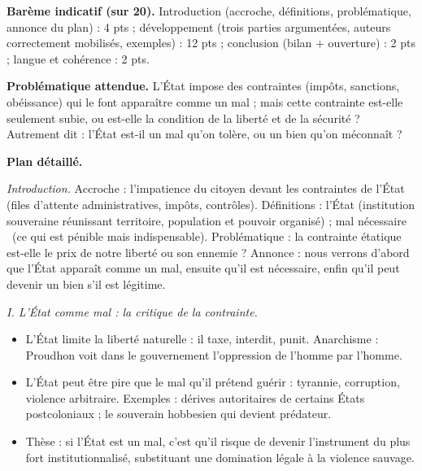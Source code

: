 \documentclass[11pt]{article}
\begin{document}
\begin{corrige}

\textbf{Barème indicatif (sur 20).} Introduction (accroche, définitions, problématique, annonce du plan) : 4 pts ; développement (trois parties argumentées, auteurs correctement mobilisés, exemples) : 12 pts ; conclusion (bilan + ouverture) : 2 pts ; langue et cohérence : 2 pts.

\textbf{Problématique attendue.} L'État impose des contraintes (impôts, sanctions, obéissance) qui le font apparaître comme un mal ; mais cette contrainte est-elle seulement subie, ou est-elle la condition de la liberté et de la sécurité ? Autrement dit : l'État est-il un mal qu'on tolère, ou un bien qu'on méconnaît ?

\textbf{Plan détaillé.}

\emph{Introduction.} Accroche : l'impatience du citoyen devant les contraintes de l'État (files d'attente administratives, impôts, contrôles). Définitions : l'État (institution souveraine réunissant territoire, population et pouvoir organisé) ; \guillemotleft mal nécessaire \guillemotright\ (ce qui est pénible mais indispensable). Problématique : la contrainte étatique est-elle le prix de notre liberté ou son ennemie ? Annonce : nous verrons d'abord que l'État apparaît comme un mal, ensuite qu'il est nécessaire, enfin qu'il peut devenir un bien s'il est légitime.

\emph{I. L'État comme mal : la critique de la contrainte.}
\begin{itemize}
\item L'État limite la liberté naturelle : il taxe, interdit, punit. Anarchisme : Proudhon voit dans le gouvernement l'oppression de l'homme par l'homme.
\item L'État peut être pire que le mal qu'il prétend guérir : tyrannie, corruption, violence arbitraire. Exemples : dérives autoritaires de certains États postcoloniaux ; le souverain hobbesien qui devient prédateur.
\item Thèse : si l'État est un mal, c'est qu'il risque de devenir l'instrument du plus fort institutionnalisé, substituant une domination légale à la violence sauvage.
\end{itemize}


\end{corrige}
\end{document}
